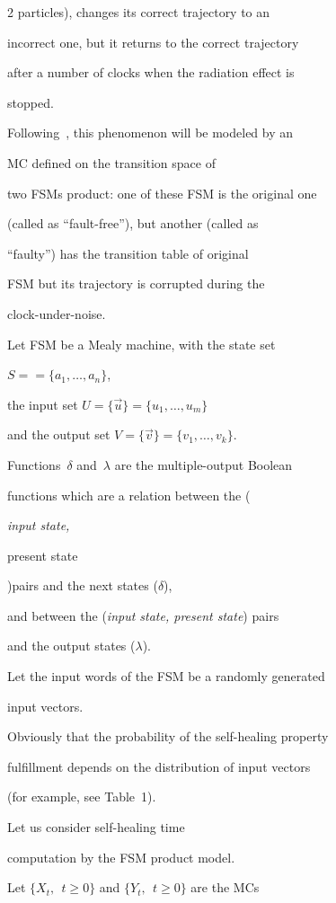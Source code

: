 \begin{multicols}{2}
particles), changes its correct trajectory to an

incorrect one, but it returns to the correct trajectory

after a number of clocks when the radiation effect is

stopped.

Following~\cite{7fr}, this phenomenon will be modeled by an

MC defined on the transition space of

two FSMs product: one of these FSM is the original one

(called as ``fault-free''), but another (called as

``faulty'') has the transition table of original

FSM but its trajectory is corrupted during the

clock-under-noise.



Let FSM be a Mealy machine, with the state set

$S=$\linebreak $=\{a_1,\ldots,a_n\}$,

the input set $U=\{\vec u\}=\{u_1,\ldots, u_m\}$

and the output set $V=\{\vec v\}=\{v_1,\ldots, v_k\}$.

Functions~$\delta$ and~$\lambda$ are the multiple-output Boolean

functions which are a relation between the ({\it input state,\,

present state})\linebreak pairs and the next states ($\delta$),

and between the (\textit{input state, present state}) pairs

and the output states ($\lambda$).

Let the input words of the FSM be a randomly generated

input vectors.

Obviously that the probability of the self-healing property

fulfillment depends on the distribution of input vectors

(for example, see Table~1).

Let us consider self-healing time

computation by the FSM product model.



Let $\{X_t,\ \ t\ge0\}$ and $\{Y_t,\ \  t\ge0\}$ are the MCs


\end{multicols}
